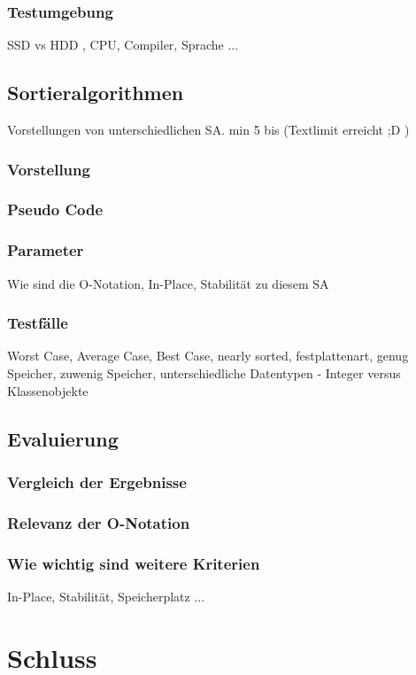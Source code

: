 \documentclass{article}
\begin{document}
\subsubsection{Testumgebung}
SSD vs HDD , CPU, Compiler, Sprache ...


\subsection{Sortieralgorithmen}
Vorstellungen von unterschiedlichen SA. min 5 bis (Textlimit erreicht ;D  ) 
\subsubsection{Vorstellung}
\subsubsection{Pseudo Code}
\subsubsection{Parameter}
Wie sind die O-Notation, In-Place, Stabilität zu diesem SA
\subsubsection{Testfälle}
Worst Case, Average Case, Best Case, nearly sorted, festplattenart, genug Speicher, zuwenig Speicher, unterschiedliche Datentypen - Integer versus Klassenobjekte


\subsection{Evaluierung}
\subsubsection{Vergleich der Ergebnisse}
\subsubsection{Relevanz der O-Notation}
\subsubsection{Wie wichtig sind weitere Kriterien}
In-Place, Stabilität, Speicherplatz ...

\section{Schluss}
\end{document}
